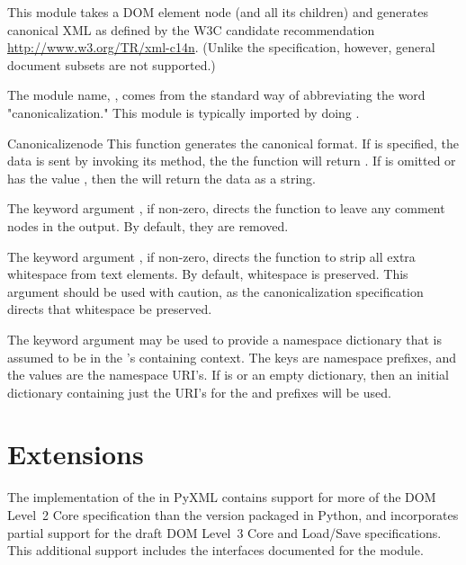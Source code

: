 \documentclass{howto}
\begin{document}
This module takes a DOM element node (and all its children) and generates
canonical XML as defined by the W3C candidate recommendation
\url{http://www.w3.org/TR/xml-c14n}.
(Unlike the specification, however, general document subsets are not
supported.)

The module name, , comes from the standard way of abbreviating
the word "canonicalization."
This module is typically imported by doing
.

\begin{funcdesc}{Canonicalize}{node}
This function generates the canonical format.
If  is specified, the data is sent by invoking its
 method, the the function will return .
If  is omitted or has the value , then
the  will return the data as a string.

The keyword argument , if non-zero, directs the function
to leave any comment nodes in the output. By default, they are removed.

The keyword argument , if non-zero, directs the function
to strip all extra whitespace from text elements.
By default, whitespace is preserved.
This argument should be used with caution, as the canonicalization
specification directs that whitespace be preserved.

The keyword argument  may be used to provide a namespace
dictionary that is assumed to be in the 's containing
context.
The keys are namespace prefixes, and the values are the namespace URI's.
If  is  or an empty dictionary, then an initial
dictionary containing just the URI's for the  and 
prefixes will be used.
\end{funcdesc}


\section{ Extensions}

The implementation of the  in PyXML contains
support for more of the DOM Level~2 Core specification than the
version packaged in Python, and incorporates partial support for the
draft DOM Level~3 Core and Load/Save specifications.  This additional
support includes the interfaces documented for the
 module.
\end{document}
